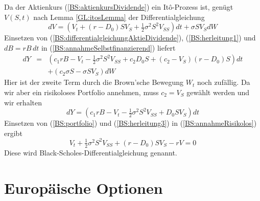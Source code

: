 Da der Aktienkurs (\ref{BS:aktienkursDividende}) ein Itô-Prozess ist, genügt $V(S,t)$ nach Lemma \ref{GL:itosLemma} der Differentialgleichung
\begin{equation}
dV = \left( V_t + \left(r - D_0\right)SV_S + \tfrac{1}{2} \sigma^2 S^2 V_{SS}\right)dt + \sigma S V_S dW \label{BS:herleitung1}
\end{equation}
Einsetzen von (\ref{BS:differentialgleichungAktieDividende}), (\ref{BS:herleitung1}) und $dB = rB \,dt$ in (\ref{BS:annahmeSelbstfinanzierend}) liefert
\begin{eqnarray}
dY &=& \left( c_1rB - V_t - \tfrac{1}{2}\sigma^2S^2V_{SS} + c_2D_0S + \left(c_2 - V_S\right)\left(r - D_0\right)S\right)dt \nonumber \\
& & + \left(c_2 \sigma S - \sigma S V_S \right)dW \label{BS:herleitung2}
\end{eqnarray}
Hier ist der zweite Term durch die Brown'sche Bewegung $W_t$ noch zufällig. Da wir aber ein risikoloses Portfolio annehmen, muss $c_2 = V_S$ gewählt werden und wir erhalten 
\begin{equation}
dY = \left( c_1rB - V_t - \tfrac{1}{2}\sigma^2S^2V_{SS} + D_0SV_S\right)dt \label{BS:herleitung3}
\end{equation}
Einsetzen von (\ref{BS:portfolio}) und (\ref{BS:herleitung3}) in (\ref{BS:annahmeRisikolos}) ergibt
\begin{equation}
V_t + \tfrac{1}{2}\sigma^2S^2V_{SS} + \left(r-D_0\right)SV_S - rV = 0 \label{BS:differentialgleichungOption}
\end{equation}
Diese wird Black-Scholes-Differentialgleichung genannt.

\section{Europäische Optionen}                                %

